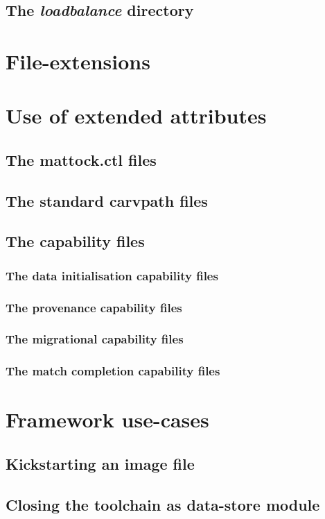 \begin{itemize}
\begin{itemize}
\begin{itemize}
\begin{itemize}
\subsection{The \emph{loadbalance} directory}
\section{File-extensions}
\section{Use of extended attributes}
\subsection{The mattock.ctl files}
\subsection{The standard carvpath files}
\subsection{The capability files}
\subsubsection{The data initialisation capability files}
\subsubsection{The provenance capability files}
\subsubsection{The migrational capability files}
\subsubsection{The match completion capability files}
\section{Framework use-cases}
\subsection{Kickstarting an image file}
\subsection{Closing the toolchain as data-store module}

\end{itemize}
\end{itemize}
\end{itemize}
\end{itemize}
